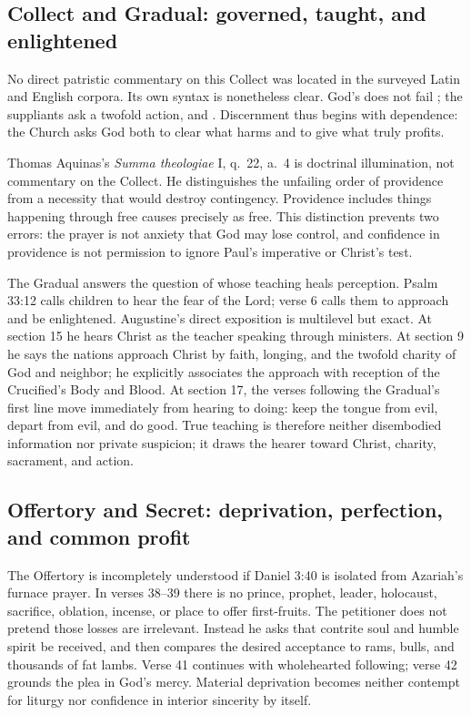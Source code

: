 \begin{deepstudy}
\sectionguard
\subsection*{Collect and Gradual: governed, taught, and enlightened}

No direct patristic commentary on this Collect was located in the surveyed Latin and English corpora. Its own syntax is nonetheless clear. God's  does not fail ; the suppliants ask a twofold action,  and . Discernment thus begins with dependence: the Church asks God both to clear what harms and to give what truly profits.

Thomas Aquinas's \emph{Summa theologiae} I, q.~22, a.~4 is doctrinal illumination, not commentary on the Collect. He distinguishes the unfailing order of providence from a necessity that would destroy contingency. Providence includes things happening through free causes precisely as free. This distinction prevents two errors: the prayer is not anxiety that God may lose control, and confidence in providence is not permission to ignore Paul's imperative or Christ's test.

The Gradual answers the question of whose teaching heals perception. Psalm 33:12 calls children to hear the fear of the Lord; verse 6 calls them to approach and be enlightened. Augustine's direct exposition is multilevel but exact. At section 15 he hears Christ as the teacher speaking through ministers. At section 9 he says the nations approach Christ by faith, longing, and the twofold charity of God and neighbor; he explicitly associates the approach with reception of the Crucified's Body and Blood. At section 17, the verses following the Gradual's first line move immediately from hearing to doing: keep the tongue from evil, depart from evil, and do good. True teaching is therefore neither disembodied information nor private suspicion; it draws the hearer toward Christ, charity, sacrament, and action.

\sectionguard
\subsection*{Offertory and Secret: deprivation, perfection, and common profit}

The Offertory is incompletely understood if Daniel 3:40 is isolated from Azariah's furnace prayer. In verses 38--39 there is no prince, prophet, leader, holocaust, sacrifice, oblation, incense, or place to offer first-fruits. The petitioner does not pretend those losses are irrelevant. Instead he asks that contrite soul and humble spirit be received, and then compares the desired acceptance to rams, bulls, and thousands of fat lambs. Verse 41 continues with wholehearted following; verse 42 grounds the plea in God's mercy. Material deprivation becomes neither contempt for liturgy nor confidence in interior sincerity by itself.


\end{deepstudy}
